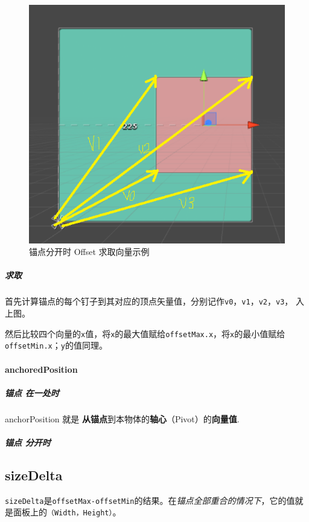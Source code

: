 \documentclass[UTF8,a4paper,12pt]{ctexbook}
\begin{document}
					\begin{figure}[H]
						\centering
						\includegraphics[scale=0.7]{Anchors-2.png}
						\caption{锚点分开时  Offset 求取向量示例}
					\end{figure}
			
				\subparagraph{求取}
					首先计算锚点的每个钉子到其对应的顶点矢量值，分别记作\verb|v0|，\verb|v1|，\verb|v2|，\verb|v3|， 入上图。
					
					然后比较四个向量的\verb|x|值，将\verb|x|的最大值赋给\verb|offsetMax.x|，将\verb|x|的最小值赋给\verb|offsetMin.x|；\verb|y|的值同理。
			
			\paragraph{anchoredPosition}
				\subparagraph{锚点 在一处时}
					anchorPosition 就是 \textbf{从锚点}到本物体的\textbf{轴心}（Pivot）的\textbf{向量值}.
				
				\subparagraph{锚点 分开时}
						
		\subsection{sizeDelta}
		
			\verb|sizeDelta|是\verb|offsetMax-offsetMin|的结果。在\textit{锚点全部重合的情况下}，它的值就是面板上的\verb|（Width，Height）|。
			
\end{document}
